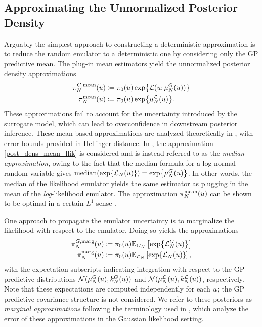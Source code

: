 \documentclass[12pt]{article}
\begin{document}
\subsection{Approximating the Unnormalized Posterior Density}
Arguably the simplest approach to constructing a deterministic approximation is to reduce the random emulator 
to a deterministic one by considering only the GP predictive mean. 
The plug-in mean estimators yield the unnormalized posterior density approximations 
\begin{align}
\fwdEmMeanDens[\Ndesign](\Par) &\Def \priorDens(\Par) \Exp{\llik(\Par; \emMean[\Ndesign]{\fwd}(\Par))}
 \label{post_dens_mean_fwd} \\
\llikEmMeanDens[\Ndesign](\Par) &\Def \priorDens(\Par) \Exp{\emMean[\Ndesign]{\llik}(\Par)} 
\label{post_dens_mean_llik}.
\end{align}
These approximations fail to account for the uncertainty introduced by the surrogate model, which can lead 
to overconfidence in downstream posterior inference. These mean-based approximations are analyzed 
theoretically in \cite{StuartTeck1}, with error bounds provided in Hellinger distance. In \cite{VehtariParallelGP}, 
the approximation \ref{post_dens_mean_llik} is considered and is instead referred to as the 
\textit{median approximation}, owing to the fact that the median formula for a log-normal random variable 
gives $\text{median}(\Exp{\llikEm[\Ndesign](\Par)}) = \Exp{\emMean[\Ndesign]{\fwd}(\Par)}$. In other words, 
the median of the likelihood emulator yields the same estimator as plugging in the mean of the 
\textit{log}-likelihood emulator.
The approximation $\llikEmMeanDens[\Ndesign](\Par)$ can be shown to be optimal in a certain  
$L^1$ sense \cite{VehtariParallelGP, StuartTeck2}. 

One approach to propagate the 
emulator uncertainty is to marginalize the likelihood with respect to the emulator. Doing so yields the approximations 
\begin{align}
\fwdEmMargDens[\Ndesign](\Par) &\Def \priorDens(\Par) \E_{\fwdEm}\left[\Exp{\llikEmFwd[\Ndesign](\Par)} \right] \label{post_dens_marg_fwd} \\
\llikEmMargDens[\Ndesign](\Par) &\Def \priorDens(\Par) \E_{\llikEm}\left[\Exp{\llikEm[\Ndesign](\Par)} \right], \label{post_dens_marg_llik}
\end{align}
with the expectation subscripts indicating integration with respect to the GP predictive distributions 
$\Gaussian(\emMean[\Ndesign]{\fwd}(\Par), \emKer[\Ndesign]{\fwd}(\Par))$ and
$\Gaussian(\emMean[\Ndesign]{\llik}(\Par), \emKer[\Ndesign]{\llik}(\Par))$, respectively. Note that these expectations are 
computed independently for each $\Par$; the GP predictive covariance structure is not considered. 
We refer to these posteriors as \textit{marginal approximations} following the terminology used in
 \cite{StuartTeck1, StuartTeck2}, which analyze the error of these approximations in the Gaussian likelihood setting. 
\end{document}

